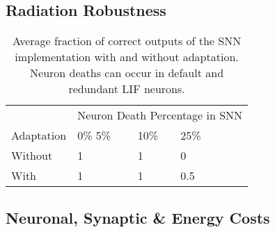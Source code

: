 \subsection*{Radiation Robustness}\label{subsec:algorithm_performance}

\begin{table}[H]
\caption{Average fraction of correct outputs of the SNN implementation with and without adaptation. Neuron deaths can occur in default and redundant LIF neurons.}
\begin{tabular}{llllll}
        & \multicolumn{5}{l}{Neuron Death Percentage in SNN} \\ \cmidrule{2-6}
        Adaptation & 0\%   5\% & 10\%    & 25\%     \\ \hline
        Without      & 1 &  1    & 0                 \\
        With      & 1 & 1    & 0.5                   \\    
\end{tabular}
\end{table}


\subsection*{Neuronal, Synaptic \& Energy Costs}\label{subsec:results_neuronal_synaptic_overcapacity}

